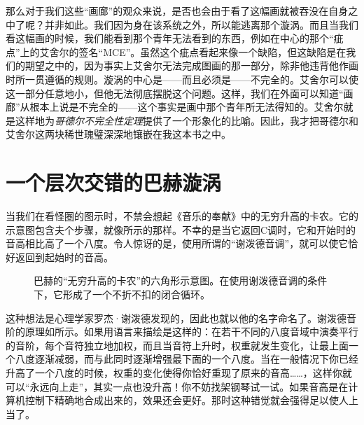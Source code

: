 那么对于我们这些“画廊”的观众来说，是否也会由于看了这幅画就被吞没在自身之中了呢？并非如此。我们因为身在该系统之外，所以能逃离那个漩涡。而且当我们看这幅画的时候，我们能看到那个青年无法看到的东西，例如在中心的那个“疵点”上的艾舍尔的签名“MCE”。虽然这个疵点看起来像一个缺陷，但这缺陷是在我们的期望之中的，因为事实上艾舍尔无法完成图画的那一部分，除非他违背他作画时所一贯遵循的规则。漩涡的中心是——而且必须是——不完全的。艾舍尔可以使这一部分任意地小，但他无法彻底摆脱这个问题。这样，我们在外面可以知道“画廊”从根本上说是不完全的——这个事实是画中那个青年所无法得知的。艾舍尔就是这样地为\emph{哥德尔不完全性定理}提供了一个形象化的比喻。因此，我才把哥德尔和艾舍尔这两块稀世瑰璧深深地镶嵌在我这本书之中。

\section{一个层次交错的巴赫漩涡}

当我们在看怪圈的图示时，不禁会想起《音乐的奉献》中的无穷升高的卡农。它的示意图包含夫个步骤，就像所示的那样。不幸的是当它返回C调时，它和开始时的音高相比高了一个八度。令人惊讶的是，使用所谓的“谢泼德音调”，就可以使它恰好返回到起始时的音高。

\begin{figure}
\caption[用谢泼德音调演奏的巴赫“无穷升高的卡农”形成了一个怪圈。]
  {巴赫的“无穷升高的卡农”的六角形示意图。在使用谢泼德音调的条件下，它形成了一个不折不扣的闭合循环。}
\end{figure}

这种想法是心理学家罗杰·谢泼德发现的，因此也就以他的名字命名了。谢泼德音阶的原理如所示。如果用语言来描绘是这样的：在若干不同的八度音域中演奏平行的音阶，每个音符独立地加权，而且当音符上升时，权重就发生变化，让最上面一个八度逐渐减弱，而与此同时逐渐增强最下面的一个八度。当在一般情况下你已经升高了一个八度的时候，权重的变化使得你恰好重现了原来的音高……，这样你就可以“永远向上走”，其实一点也没升高！你不妨找架钢琴试一试。如果音高是在计算机控制下精确地合成出来的，效果还会更好。那时这种错觉就会强得足以使人上当了。

